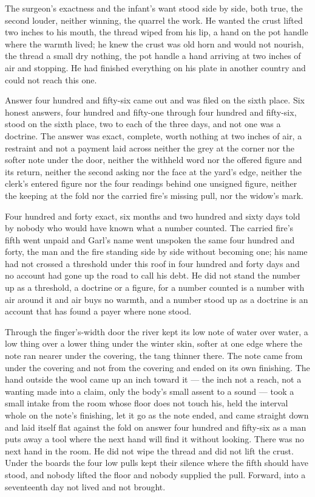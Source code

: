 The surgeon's exactness and the infant's want stood side by side, both true, the second louder, neither winning, the quarrel the work. He wanted the crust lifted two inches to his mouth, the thread wiped from his lip, a hand on the pot handle where the warmth lived; he knew the crust was old horn and would not nourish, the thread a small dry nothing, the pot handle a hand arriving at two inches of air and stopping. He had finished everything on his plate in another country and could not reach this one.

Answer four hundred and fifty-six came out and was filed on the sixth place. Six honest answers, four hundred and fifty-one through four hundred and fifty-six, stood on the sixth place, two to each of the three days, and not one was a doctrine. The answer was exact, complete, worth nothing at two inches of air, a restraint and not a payment laid across neither the grey at the corner nor the softer note under the door, neither the withheld word nor the offered figure and its return, neither the second asking nor the face at the yard's edge, neither the clerk's entered figure nor the four readings behind one unsigned figure, neither the keeping at the fold nor the carried fire's missing pull, nor the widow's mark.

Four hundred and forty exact, six months and two hundred and sixty days told by nobody who would have known what a number counted. The carried fire's fifth went unpaid and Garl's name went unspoken the same four hundred and forty, the man and the fire standing side by side without becoming one; his name had not crossed a threshold under this roof in four hundred and forty days and no account had gone up the road to call his debt. He did not stand the number up as a threshold, a doctrine or a figure, for a number counted is a number with air around it and air buys no warmth, and a number stood up as a doctrine is an account that has found a payer where none stood.

Through the finger's-width door the river kept its low note of water over water, a low thing over a lower thing under the winter skin, softer at one edge where the note ran nearer under the covering, the tang thinner there. The note came from under the covering and not from the covering and ended on its own finishing. The hand outside the wool came up an inch toward it --- the inch not a reach, not a wanting made into a claim, only the body's small assent to a sound --- took a small intake from the room whose floor does not touch his, held the interval whole on the note's finishing, let it go as the note ended, and came straight down and laid itself flat against the fold on answer four hundred and fifty-six as a man puts away a tool where the next hand will find it without looking. There was no next hand in the room. He did not wipe the thread and did not lift the crust. Under the boards the four low pulls kept their silence where the fifth should have stood, and nobody lifted the floor and nobody supplied the pull. Forward, into a seventeenth day not lived and not brought.
